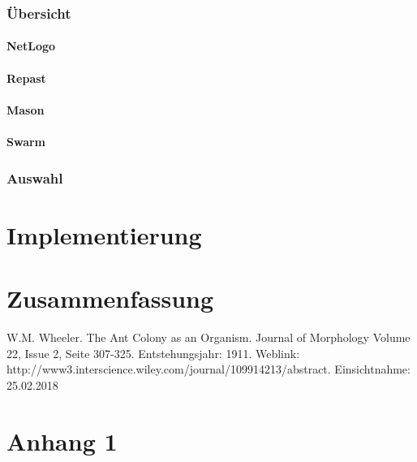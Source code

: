 \documentclass[a4paper, 11pt]{article}
\makeatletter
\newcommand*{\appendixtoc}{
	\begingroup
	\edef\@alltocdepth{\the\value{tocdepth}}
	\setcounter{tocdepth}{-10000}
	\renewcommand*{\contentsname}{
		Verzeichnis der Anh\"ange}
	\renewcommand*{\appendixattoc}{
		\setcounter{tocdepth}{\@alltocdepth}
	}
	\tableofcontents
	\setcounter{tocdepth}{\@alltocdepth}
	\endgroup
}
\newcommand*{\appendixattoc}{
}
\makeatother
\begin{document}
\subsubsection{Übersicht}
\paragraph{NetLogo}
\paragraph{Repast}
\paragraph{Mason}
\paragraph{Swarm}
\subsubsection{Auswahl}

\section{Implementierung}
\section{Zusammenfassung}

\newpage
\begin{thebibliography}{sotief}
	W.M. Wheeler. The Ant Colony as an Organism. Journal of Morphology Volume 22, Issue 2, Seite 307-325. Entstehungsjahr: 1911.\newline\newline
	Weblink: http://www3.interscience.wiley.com/journal/109914213/abstract. Einsichtnahme: 25.02.2018
\end{thebibliography}
\newpage
\appendixtoc
\newpage
\section{Anhang 1} 
\end{document}
